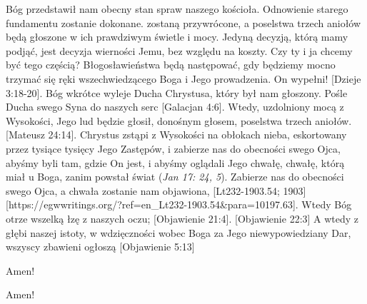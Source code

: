 Bóg przedstawił nam obecny stan spraw naszego kościoła. Odnowienie starego fundamentu zostanie dokonane.  zostaną przywrócone, a poselstwa trzech aniołów będą głoszone w ich prawdziwym świetle i mocy. Jedyną decyzją, którą mamy podjąć, jest decyzja wierności Jemu, bez względu na koszty. Czy ty i ja chcemy być tego częścią? Błogosławieństwa będą następować, gdy będziemy mocno trzymać się ręki wszechwiedzącego Boga i Jego prowadzenia.  On wypełni! [Dzieje 3:18-20]. Bóg wkrótce wyleje Ducha Chrystusa, który był nam głoszony. Pośle Ducha swego Syna do naszych serc [Galacjan 4:6]. Wtedy, uzdolniony mocą z Wysokości, Jego lud będzie głosił, donośnym głosem, poselstwa trzech aniołów. [Mateusz 24:14]. Chrystus zstąpi z Wysokości na obłokach nieba, eskortowany przez tysiące tysięcy Jego Zastępów, i zabierze nas do obecności swego Ojca, abyśmy byli tam, gdzie On jest, i abyśmy oglądali Jego chwałę, chwałę, którą miał u Boga, zanim powstał świat (\textit{Jan 17: 24, 5}). Zabierze nas do obecności swego Ojca, a chwała zostanie nam objawiona, [Lt232-1903.54; 1903][https://egwwritings.org/?ref=en\_Lt232-1903.54&para=10197.63]. Wtedy Bóg otrze wszelką łzę z naszych oczu; [Objawienie 21:4]. [Objawienie 22:3] A wtedy z głębi naszej istoty, w wdzięczności wobec Boga za Jego niewypowiedziany Dar, wszyscy zbawieni  ogłoszą [Objawienie 5:13]


Amen!


Amen!




% 